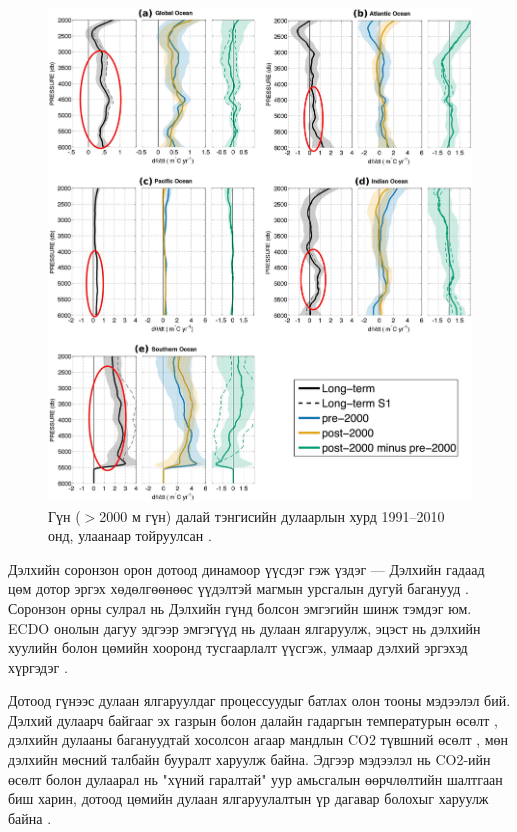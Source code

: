 \documentclass[10pt,twocolumn,letterpaper]{article}
\begin{document}
\begin{figure}[t]
\begin{center}
   \includegraphics[width=1\linewidth]{ocean-highlight.jpg}
\end{center}
   \caption{Гүн ($>$2000 м гүн) далай тэнгисийн дулаарлын хурд 1991–2010 онд, улаанаар тойруулсан \cite{132}.}
\label{fig:15}
\label{fig:onecol}
\end{figure}

Дэлхийн соронзон орон дотоод динамоор үүсдэг гэж үздэг — Дэлхийн гадаад цөм дотор эргэх хөдөлгөөнөөс үүдэлтэй магмын урсгалын дугуй баганууд \cite{123}. Соронзон орны сулрал нь Дэлхийн гүнд болсон эмгэгийн шинж тэмдэг юм. ECDO онолын дагуу эдгээр эмгэгүүд нь дулаан ялгаруулж, эцэст нь дэлхийн хуулийн болон цөмийн хооронд тусгаарлалт үүсгэж, улмаар дэлхий эргэхэд хүргэдэг \cite{1}.

Дотоод гүнээс дулаан ялгаруулдаг процессуудыг батлах олон тооны мэдээлэл бий. Дэлхий дулаарч байгааг эх газрын болон далайн гадаргын температурын өсөлт \cite{127,128}, дэлхийн дулааны багануудтай хосолсон агаар мандлын CO2 түвшний өсөлт \cite{129,130}, мөн дэлхийн мөсний талбайн бууралт \cite{131} харуулж байна. Эдгээр мэдээлэл нь CO2-ийн өсөлт болон дулаарал нь "хүний гаралтай" уур амьсгалын өөрчлөлтийн шалтгаан биш харин, дотоод цөмийн дулаан ялгаруулалтын үр дагавар болохыг харуулж байна \cite{129}.
\end{document}
